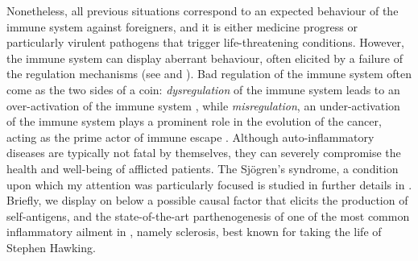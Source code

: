 Nonetheless, all previous situations correspond to an expected behaviour of the immune system against foreigners, and it is either medicine progress or particularly virulent pathogens that trigger life-threatening conditions. However, the immune system can display aberrant behaviour, often elicited by a failure of the regulation mechanisms (see  and \autocite{schnell_etal20}). Bad regulation of the immune system often come as the two sides of a coin: \emph{dysregulation} of the immune system leads to an over-activation of the immune system \autocite{rosenblum_etal15}, while \emph{misregulation}, an under-activation of the immune system plays a prominent role in the evolution of the cancer, acting as the prime actor of immune escape \autocite{chakraborty_etal22}. Although auto-inflammatory diseases are typically not fatal by themselves, they can severely compromise the health and well-being of afflicted patients. The Sjögren's syndrome, a condition upon which my attention was particularly focused  is studied in further details in . Briefly, we display on  below a possible causal factor that elicits the production of self-antigens, and the state-of-the-art parthenogenesis of one of the most common inflammatory ailment in , namely sclerosis, best known for taking the life of Stephen Hawking.


